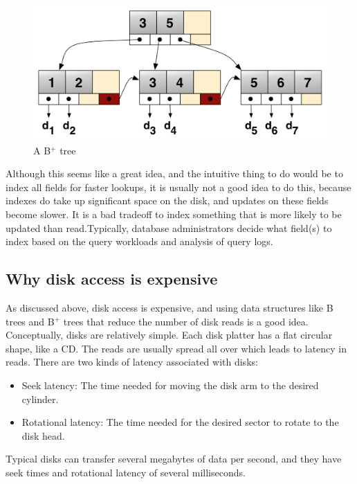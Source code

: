 \documentclass[twoside]{article}
\begin{document}
\begin{figure}
    \centering
    \includegraphics[scale=0.6]{b+tree.png}
    \caption{A B$^+$ tree}
    \label{fig:my_label}
\end{figure}


Although this seems like a great idea, and the intuitive thing to do would be to index all fields for faster lookups, it is usually not a good idea to do this, because indexes do take up significant space on the disk, and updates on these fields become slower. It is a bad tradeoff to index something that is more likely to be updated than read.Typically, database administrators decide what field(s) to index based on the query workloads and analysis of query logs.
\newpage
\subsection{Why disk access is expensive} 
As discussed above, disk access is expensive, and using data structures like B trees and B$^+$ trees that reduce the number of disk reads is a good idea. Conceptually, disks are relatively simple. Each disk platter has a flat circular shape, like a CD. The reads are usually spread all over which leads to latency in reads. There are two kinds of latency associated with disks:
\begin{itemize}
    \itemsep0em
    \item Seek latency: The time needed for moving the disk arm to the desired cylinder.
    \item Rotational latency: The time needed for the desired sector to rotate to the disk head.
\end{itemize}
 Typical disks can transfer several megabytes of data per second, and they have seek times and rotational latency of several milliseconds.
\end{document}
